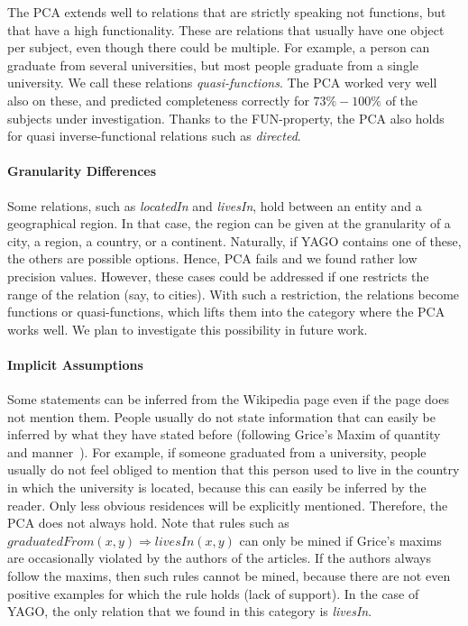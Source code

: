 The PCA extends well to relations that are strictly speaking not functions, but that have a high functionality.
These are relations that usually have one object per subject, even though there could be multiple.
For example, a person can graduate from several universities, but most people graduate from a single university. We call these relations \emph{quasi-functions}.
The PCA worked very well also on these, and predicted completeness correctly for $73\%-100\%$
of the subjects under investigation. Thanks to the FUN-property, the PCA also holds for quasi inverse-functional relations such as \emph{directed}.

\paragraph{Granularity Differences} Some relations, such as \emph{locatedIn} and \emph{livesIn}, hold between an entity and a geographical region.
In that case, the region can be given at the granularity of a city, a region, a country, or a continent.
Naturally, if YAGO contains one of these, the others are possible options. Hence, PCA fails and we found rather low precision values.
However, these cases could be addressed if one restricts the range of the relation (say, to cities).
With such a restriction, the relations become functions or quasi-functions, which lifts them into the category where the PCA works well.
We plan to investigate this possibility in future work.

\paragraph{Implicit Assumptions} Some statements can be inferred from the Wikipedia page even if the page does not mention them. %
People usually do not state information that can easily be inferred by what they have stated before
(following Grice's Maxim of quantity and manner~\cite{grice}). %
For example, if someone graduated from a university, people usually do not feel obliged to mention that this person used to live in the country
 in which the university is located,
because this can easily be inferred by the reader. Only less obvious residences will be explicitly mentioned. Therefore, the PCA does not always hold.
Note that rules such as $graduatedFrom(x,y)\Rightarrow livesIn(x,y)$ can only be mined if Grice's maxims are occasionally violated by the authors of the articles.
If the authors always follow the maxims, then such rules cannot be mined, because there are not even positive examples for which the rule holds (lack of support).
In the case of YAGO, the only relation that we found in this category is \emph{livesIn}.


